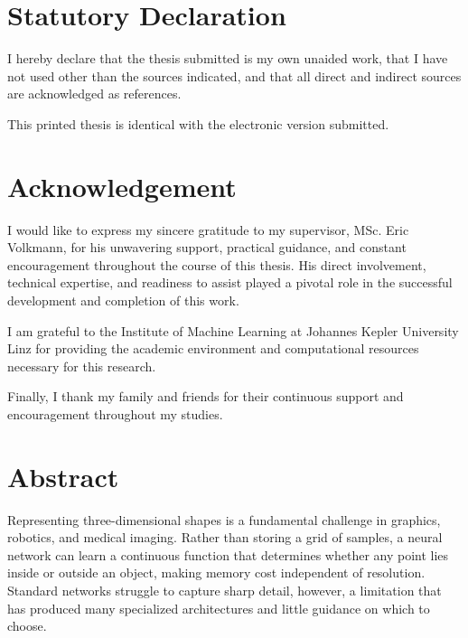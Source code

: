 
\chapter*{Statutory Declaration}

I hereby declare that the thesis submitted is my own unaided work, that I have not used other than the sources indicated, and that all direct and indirect sources are acknowledged as references.

This printed thesis is identical with the electronic version submitted.

\vspace{2cm}

\chapter*{Acknowledgement}

I would like to express my sincere gratitude to my supervisor, MSc. Eric Volkmann, for his unwavering support, practical guidance, and constant encouragement throughout the course of this thesis. His direct involvement, technical expertise, and readiness to assist played a pivotal role in the successful development and completion of this work.

I am grateful to the Institute of Machine Learning at Johannes Kepler University Linz for providing the academic environment and computational resources necessary for this research.


Finally, I thank my family and friends for their continuous support and encouragement throughout my studies.

\chapter*{Abstract}

Representing three-dimensional shapes is a fundamental challenge in graphics, robotics, and medical imaging. Rather than storing a grid of samples, a neural network can learn a continuous function that determines whether any point lies inside or outside an object, making memory cost independent of resolution. Standard networks struggle to capture sharp detail, however, a limitation that has produced many specialized architectures and little guidance on which to choose.

